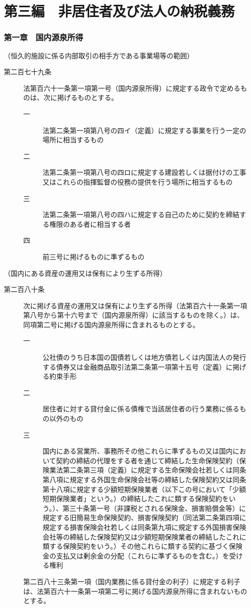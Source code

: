 \documentclass[twocolumn,a4j,10pt]{ltjtarticle}
\begin{document}
\part*{第三編　非居住者及び法人の納税義務}
\section*{第一章　国内源泉所得}
\noindent\hspace{10pt}（恒久的施設に係る内部取引の相手方である事業場等の範囲）
\begin{description}
\item[第二百七十九条]法第百六十一条第一項第一号（国内源泉所得）に規定する政令で定めるものは、次に掲げるものとする。
\begin{description}
\item[一]法第二条第一項第八号の四イ（定義）に規定する事業を行う一定の場所に相当するもの
\item[二]法第二条第一項第八号の四ロに規定する建設若しくは据付けの工事又はこれらの指揮監督の役務の提供を行う場所に相当するもの
\item[三]法第二条第一項第八号の四ハに規定する自己のために契約を締結する権限のある者に相当する者
\item[四]前三号に掲げるものに準ずるもの
\end{description}
\end{description}
\noindent\hspace{10pt}（国内にある資産の運用又は保有により生ずる所得）
\begin{description}
\item[第二百八十条]次に掲げる資産の運用又は保有により生ずる所得（法第百六十一条第一項第八号から第十六号まで（国内源泉所得）に該当するものを除く。）は、同項第二号に掲げる国内源泉所得に含まれるものとする。
\begin{description}
\item[一]公社債のうち日本国の国債若しくは地方債若しくは内国法人の発行する債券又は金融商品取引法第二条第一項第十五号（定義）に掲げる約束手形
\item[二]居住者に対する貸付金に係る債権で当該居住者の行う業務に係るもの以外のもの
\item[三]国内にある営業所、事務所その他これらに準ずるもの又は国内において契約の締結の代理をする者を通じて締結した生命保険契約（保険業法第二条第三項（定義）に規定する生命保険会社若しくは同条第八項に規定する外国生命保険会社等の締結した保険契約又は同条第十八項に規定する少額短期保険業者（以下この号において「少額短期保険業者」という。）の締結したこれに類する保険契約をいう。）、第三十条第一号（非課税とされる保険金、損害賠償金等）に規定する旧簡易生命保険契約、損害保険契約（同法第二条第四項に規定する損害保険会社若しくは同条第九項に規定する外国損害保険会社等の締結した保険契約又は少額短期保険業者の締結したこれに類する保険契約をいう。）その他これらに類する契約に基づく保険金の支払又は剰余金の分配（これらに準ずるものを含む。）を受ける権利
\end{description}
\item[]第二百八十三条第一項（国内業務に係る貸付金の利子）に規定する利子は、法第百六十一条第一項第二号に掲げる国内源泉所得に含まれないものとする。
\end{description}
\end{document}
